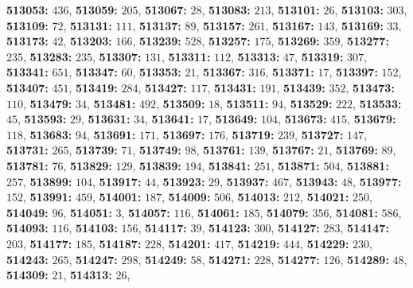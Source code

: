 \textsf{\bfseries 513053:} $436$, \textsf{\bfseries 513059:} $205$, \textsf{\bfseries 513067:} $28$, \textsf{\bfseries 513083:} $213$, \textsf{\bfseries 513101:} $26$, \textsf{\bfseries 513103:} $303$, \textsf{\bfseries 513109:} $72$, \textsf{\bfseries 513131:} $111$, \textsf{\bfseries 513137:} $89$, \textsf{\bfseries 513157:} $261$, \textsf{\bfseries 513167:} $143$, \textsf{\bfseries 513169:} $33$, \textsf{\bfseries 513173:} $42$, \textsf{\bfseries 513203:} $166$, \textsf{\bfseries 513239:} $528$, \textsf{\bfseries 513257:} $175$, \textsf{\bfseries 513269:} $359$, \textsf{\bfseries 513277:} $235$, \textsf{\bfseries 513283:} $235$, \textsf{\bfseries 513307:} $131$, \textsf{\bfseries 513311:} $112$, \textsf{\bfseries 513313:} $47$, \textsf{\bfseries 513319:} $307$, \textsf{\bfseries 513341:} $651$, \textsf{\bfseries 513347:} $60$, \textsf{\bfseries 513353:} $21$, \textsf{\bfseries 513367:} $316$, \textsf{\bfseries 513371:} $17$, \textsf{\bfseries 513397:} $152$, \textsf{\bfseries 513407:} $451$, \textsf{\bfseries 513419:} $284$, \textsf{\bfseries 513427:} $117$, \textsf{\bfseries 513431:} $191$, \textsf{\bfseries 513439:} $352$, \textsf{\bfseries 513473:} $110$, \textsf{\bfseries 513479:} $34$, \textsf{\bfseries 513481:} $492$, \textsf{\bfseries 513509:} $18$, \textsf{\bfseries 513511:} $94$, \textsf{\bfseries 513529:} $222$, \textsf{\bfseries 513533:} $45$, \textsf{\bfseries 513593:} $29$, \textsf{\bfseries 513631:} $34$, \textsf{\bfseries 513641:} $17$, \textsf{\bfseries 513649:} $104$, \textsf{\bfseries 513673:} $415$, \textsf{\bfseries 513679:} $118$, \textsf{\bfseries 513683:} $94$, \textsf{\bfseries 513691:} $171$, \textsf{\bfseries 513697:} $176$, \textsf{\bfseries 513719:} $239$, \textsf{\bfseries 513727:} $147$, \textsf{\bfseries 513731:} $265$, \textsf{\bfseries 513739:} $71$, \textsf{\bfseries 513749:} $98$, \textsf{\bfseries 513761:} $139$, \textsf{\bfseries 513767:} $21$, \textsf{\bfseries 513769:} $89$, \textsf{\bfseries 513781:} $76$, \textsf{\bfseries 513829:} $129$, \textsf{\bfseries 513839:} $194$, \textsf{\bfseries 513841:} $251$, \textsf{\bfseries 513871:} $504$, \textsf{\bfseries 513881:} $257$, \textsf{\bfseries 513899:} $104$, \textsf{\bfseries 513917:} $44$, \textsf{\bfseries 513923:} $29$, \textsf{\bfseries 513937:} $467$, \textsf{\bfseries 513943:} $48$, \textsf{\bfseries 513977:} $152$, \textsf{\bfseries 513991:} $459$, \textsf{\bfseries 514001:} $187$, \textsf{\bfseries 514009:} $506$, \textsf{\bfseries 514013:} $212$, \textsf{\bfseries 514021:} $250$, \textsf{\bfseries 514049:} $96$, \textsf{\bfseries 514051:} $3$, \textsf{\bfseries 514057:} $116$, \textsf{\bfseries 514061:} $185$, \textsf{\bfseries 514079:} $356$, \textsf{\bfseries 514081:} $586$, \textsf{\bfseries 514093:} $116$, \textsf{\bfseries 514103:} $156$, \textsf{\bfseries 514117:} $39$, \textsf{\bfseries 514123:} $300$, \textsf{\bfseries 514127:} $283$, \textsf{\bfseries 514147:} $203$, \textsf{\bfseries 514177:} $185$, \textsf{\bfseries 514187:} $228$, \textsf{\bfseries 514201:} $417$, \textsf{\bfseries 514219:} $444$, \textsf{\bfseries 514229:} $230$, \textsf{\bfseries 514243:} $265$, \textsf{\bfseries 514247:} $298$, \textsf{\bfseries 514249:} $58$, \textsf{\bfseries 514271:} $228$, \textsf{\bfseries 514277:} $126$, \textsf{\bfseries 514289:} $48$, \textsf{\bfseries 514309:} $21$, \textsf{\bfseries 514313:} $26$, 
